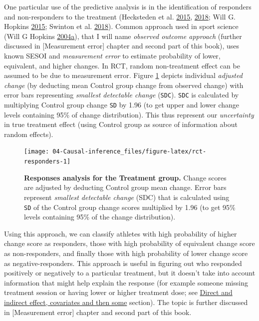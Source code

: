 \documentclass[
]{book}
\begin{document}
One particular use of the predictive analysis is in the identification of responders and non-responders to the treatment (Hecksteden et al. \protect\hyperlink{ref-heckstedenIndividualResponseExercise2015}{2015}, \protect\hyperlink{ref-heckstedenRepeatedTestingAssessment2018}{2018}; Will G. Hopkins \protect\hyperlink{ref-hopkinsIndividualResponsesMade2015}{2015}; Swinton et al. \protect\hyperlink{ref-swintonStatisticalFrameworkInterpret2018}{2018}). Common approach used in sport science (Will G Hopkins \protect\hyperlink{ref-hopkinsHowInterpretChanges2004}{2004}\protect\hyperlink{ref-hopkinsHowInterpretChanges2004}{a}), that I will name \emph{observed outcome approach} (further discussed in {[}Measurement error{]} chapter and second part of this book), uses known SESOI and \emph{measurement error} to estimate probability of lower, equivalent, and higher changes. In RCT, random non-treatment effect can be assumed to be due to measurement error. Figure \ref{fig:rct-responders} depicts individual \emph{adjusted change} (by deducting mean Control group change from observed change) with error bars representing \emph{smallest detectable change} (\texttt{SDC}). \texttt{SDC} is calculated by multiplying Control group change \texttt{SD} by 1.96 (to get upper and lower change levels containing 95\% of change distribution). This thus represent our \emph{uncertainty} in true treatment effect (using Control group as source of information about random effects).

\begin{figure}

{\centering \texttt{[image: 04-Causal-inference\_files/figure-latex/rct-responders-1]} 

}

\caption{\textbf{Responses analysis for the Treatment group.} Change scores are adjusted by deducting Control group mean change. Error bars represent \emph{smallest detectable change} (SDC) that is calculated using \texttt{SD} of the Control group change scores multiplied by 1.96 (to get 95\% levels containing 95\% of the change distribution).}\label{fig:rct-responders}
\end{figure}



Using this approach, we can classify athletes with high probability of higher change score as responders, those with high probability of equivalent change score as non-responders, and finally those with high probability of lower change score as negative-responders. This approach is useful in figuring out who responded positively or negatively to a particular treatment, but it doesn't take into account information that might help explain the response (for example someone missing treatment session or having lower or higher treatment dose; see \protect\hyperlink{direct-and-indirect-effect-covariates-and-then-some}{Direct and indirect effect, covariates and then some} section). The topic is further discussed in {[}Measurement error{]} chapter and second part of this book.
\end{document}
